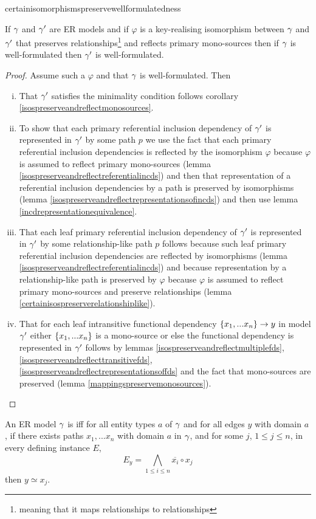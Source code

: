 certainisomorphismspreservewellformulatedness
\begin{lemma}
\label{certainisomorphismspreservewellformulatedness}
If $\gamma$ and $\gamma'$ are ER models and  if  $\varphi$ is a key-realising isomorphism between $\gamma$  and $\gamma'$ that preserves relationships\footnote{meaning that it maps relationships to relationships} and reflects primary mono-sources then if $\gamma$ is well-formulated then $\gamma'$ is well-formulated.
\end{lemma}
\begin{proof}
Assume such a $\varphi$ and that $\gamma$ is well-formulated. Then
\begin{enumerate} [(i)]
\item{
That $\gamma'$ satisfies the minimality condition follows corollary \ref{isospreserveandreflectmonosources}.
}
\item{ 
To show that each primary referential inclusion dependency of $\gamma'$ is represented in $\gamma'$ by some path $p$ we use the fact that each primary referential inclusion dependencies is reflected
by the isomorphism $\varphi$ because $\varphi$ is assumed to reflect primary mono-sources (lemma \ref{isospreserveandreflectreferentialincds}) and then that representation of a referential inclusion dependencies by a path is  preserved by isomorphisms (lemma \ref{isospreserveandreflectrepresentationsofincds})
and then use lemma \ref{incdrepresentationequivalence}.
}
\item{ 
That each leaf primary referential inclusion dependency of $\gamma'$ is represented in $\gamma'$ by some relationship-like path $p$
follows because such leaf primary referential inclusion dependencies are reflected by isomorphisms
(lemma \ref{isospreserveandreflectreferentialincds})
 and because  representation by a relationship-like path is preserved 
by $\varphi$  because $\varphi$ is assumed to reflect primary mono-sources and preserve relationships (lemma \ref{certainisospreserverelationshiplike}).

}
\item{
That for each leaf intransitive functional dependency $\left\{x_1,...x_n\right\} \rightarrow y$ in model $\gamma'$
either $\left\{x_1,...x_n\right\}$ is a mono-source 
or else the functional dependency is represented in $\gamma'$ 
follows by lemmas \ref{isospreserveandreflectmultiplefds}, \ref{isospreserveandreflecttransitivefds},
\ref{isospreserveandreflectrepresentationsoffds} and the fact that mono-sources are preserved (lemma \ref{mappingspreservemonosources}).
}
\end{enumerate}
\end{proof}
\begin{definition}
An ER model $\gamma$ is  iff for all entity types $a$ of $\gamma$ and for all edges $y$ with domain $a$, if there 
exists paths $x_1,...x_n$   with domain
$a$ in $\gamma$,  and for some $j$, $1 \leq j \leq n$, in every defining instance $E$,  
$$E_y = \bigwedge_{1 \leq i \leq n}{\overline{x_i}} \circ x_j$$
then $y \simeq x_j$.
\end{definition}

